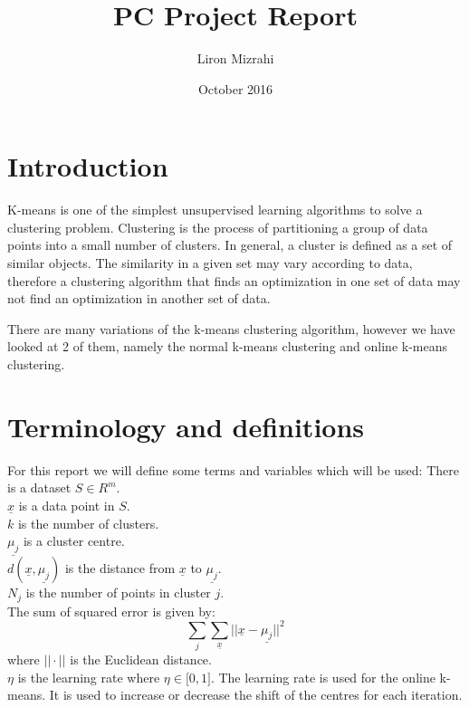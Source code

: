 \documentclass{article}
\title{PC Project Report}
\author{Liron Mizrahi}
\date{October 2016}
\begin{document}
\maketitle

\section{Introduction}
K-means is  one of the simplest unsupervised learning algorithms to solve a clustering problem. Clustering is the process of partitioning a group of data points into a small number of clusters. In general, a cluster is defined as a set of similar objects. The similarity in a given set may vary according to data, therefore a clustering algorithm that finds an optimization in one set of data may not find an optimization in another set of data.

There are many variations of the k-means clustering algorithm, however we have looked at 2 of them, namely the normal k-means clustering and online k-means clustering.


\section{Terminology and definitions}
For this report we will define some terms and variables which will be used:
There is a dataset $S \in R^m$.\\
$\underline{x}$ is a data point in $S$.\\
$k$ is the number of clusters.\\
$\underline{\mu_j}$ is a cluster centre.\\
$d(\underline{x}, \underline{\mu_j})$ is the distance from $\underline{x}$ to $\underline{\mu_j}$.\\
$N_j$ is the number of points in cluster $j$.\\
The sum of squared error is given by:
    $$\sum_{j}\sum_{\underline{x}} || \underline{x} - \underline{\mu_j} ||^2 $$
where $||\cdot||$ is the Euclidean distance.\\
$\eta$ is the learning rate where $\eta \in \big[0, 1\big]$. The learning rate is used for the online k-means. It is used to increase or decrease the shift of the centres for each iteration.
\end{document}
